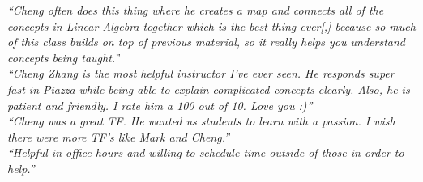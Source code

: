 \documentclass[11pt,a4paper,sans]{moderncv} %
\begin{document}
\emph{``Cheng often does this thing where he creates a map and connects all of the concepts in Linear Algebra together which is the best thing ever[,] because so much of this class builds on top of previous material, so it really helps you understand concepts being taught.''}\\[3px]
\emph{``Cheng Zhang is the most helpful instructor I've ever seen. He responds super fast in Piazza while being able to explain complicated concepts clearly. Also, he is patient and friendly. I rate him a 100 out of 10. Love you :)''}\\[3px]
\emph{``Cheng was a great TF. He wanted us students to learn with a passion. I wish there were more TF's like Mark and Cheng.''}\\[3px]
\emph{``Helpful in office hours and willing to schedule time outside of those in order to help.''}

\newpage
\printbibliography %
\end{document}
